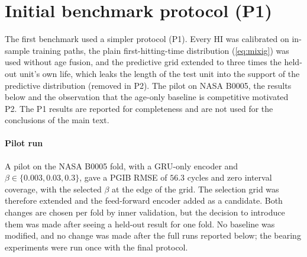\documentclass[preprint,12pt]{elsarticle}
\theoremstyle{definition}
\begin{document}
\begin{table}
\caption{Protocol P2, lower bound on the information implied by the achieved error (nats); $<0$: uninformative. $h(T)$: entropy of the pooled held-out RUL.}
\centering\small
{}
\label{tab:cert2}
\end{table}

\begin{table}
\caption{Age-conditional information lower bound (nats) under a fitted log-normal lifetime model; $\bar h(T\mid t)$: mean conditional entropy. A positive value for the age-only predictor shows that the model overestimates $h(T\mid t)$.}
\centering\small

\label{tab:certage}
\end{table}

\section{Initial benchmark protocol (P1)}
\label{app:initial}
The first benchmark used a simpler protocol (P1). Every HI was calibrated on in-sample training paths, the plain first-hitting-time distribution (\ref{eq:mixig}) was used without age fusion, and the predictive grid extended to three times the held-out unit's own life, which leaks the length of the test unit into the support of the predictive distribution (removed in P2). The pilot on NASA B0005, the results below and the observation that the age-only baseline is competitive motivated P2. The P1 results are reported for completeness and are not used for the conclusions of the main text.

\paragraph{Pilot run} A pilot on the NASA B0005 fold, with a GRU-only encoder and $\beta\in\{0.003,0.03,0.3\}$, gave a PGIB RMSE of $56.3$ cycles and zero interval coverage, with the selected $\beta$ at the edge of the grid. The selection grid was therefore extended and the feed-forward encoder added as a candidate. Both changes are chosen per fold by inner validation, but the decision to introduce them was made after seeing a held-out result for one fold. No baseline was modified, and no change was made after the full runs reported below; the bearing experiments were run once with the final protocol.

\begin{table}
\caption{Protocol P1, battery benchmarks, leave-one-unit-out (mean $\pm$ standard deviation over seeds). RMSE, MAE and CRPS in cycles.}
\centering\small
{}\\[4pt]
\\[4pt]
\label{tab:benchv1}
\end{table}
\end{document}
